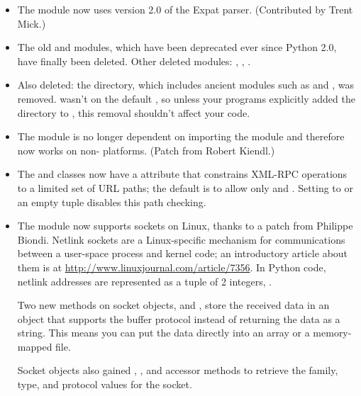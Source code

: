 \documentclass{howto}
\begin{document}
\begin{itemize}
\item The  module now uses version 2.0 of the Expat parser.
(Contributed by Trent Mick.)

\item The old  and  modules, which have been 
deprecated ever since Python 2.0, have finally been deleted.  
Other deleted modules: , ,
.

\item Also deleted: the  directory,
which includes ancient modules such as  and
, was removed.   wasn't on the default
, so unless your programs explicitly added the directory to 
, this removal shouldn't affect your code.

\item The  module is no longer 
dependent on importing the  module and
therefore now works on non-{\UNIX} platforms.
(Patch from Robert Kiendl.)

\item The  and  
classes now have a  attribute that constrains
XML-RPC operations to a limited set of URL paths; the default is
to allow only  and .  Setting 
 to  or an empty tuple disables 
this path checking.

\item The  module now supports 
sockets on Linux, thanks to a patch from Philippe Biondi.  
Netlink sockets are a Linux-specific mechanism for communications
between a user-space process and kernel code; an introductory 
article about them is at \url{http://www.linuxjournal.com/article/7356}.
In Python code, netlink addresses are represented as a tuple of 2 integers, 
.

Two new methods on socket objects,  and
, store the received data in an object 
that supports the buffer protocol instead of returning the data as a
string.  This means you can put the data directly into an array or a
memory-mapped file.

Socket objects also gained , ,
and  accessor methods to retrieve the family, type,
and protocol values for the socket.


\end{itemize}
\end{document}
